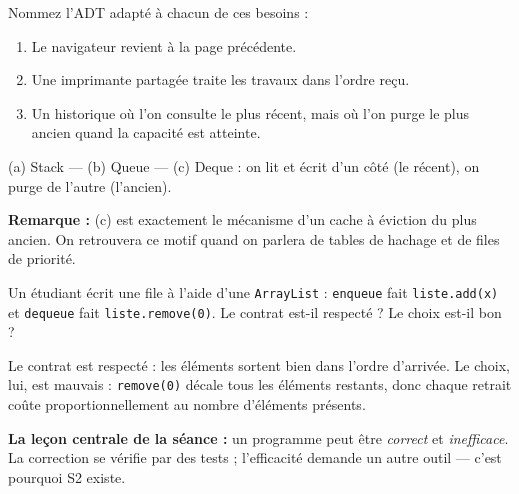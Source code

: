 \documentclass[11pt,a4paper]{article}
\theoremstyle{definition}
\theoremstyle{remark}
\begin{document}
\begin{appliboxQ}
Nommez l'ADT adapté à chacun de ces besoins :
\begin{enumerate}[nosep,label=(\alph*)]
    \item Le navigateur revient à la page précédente.
    \item Une imprimante partagée traite les travaux dans l'ordre reçu.
    \item Un historique où l'on consulte le plus récent, mais où l'on purge
          le plus ancien quand la capacité est atteinte.
\end{enumerate}
\end{appliboxQ}

\begin{appliboxR}[Réponse]
(a) Stack --- (b) Queue --- (c) Deque : on lit et écrit d'un côté (le
récent), on purge de l'autre (l'ancien).

\textbf{Remarque :} (c) est exactement le mécanisme d'un cache à éviction du
plus ancien. On retrouvera ce motif quand on parlera de tables de hachage et
de files de priorité.
\end{appliboxR}

\begin{appliboxQ}
Un étudiant écrit une file à l'aide d'une \texttt{ArrayList} :
\texttt{enqueue} fait \texttt{liste.add(x)} et \texttt{dequeue} fait
\texttt{liste.remove(0)}. Le contrat est-il respecté ? Le choix est-il bon ?
\end{appliboxQ}

\begin{appliboxR}[Réponse]
Le contrat est respecté : les éléments sortent bien dans l'ordre d'arrivée.
Le choix, lui, est mauvais : \texttt{remove(0)} décale tous les éléments
restants, donc chaque retrait coûte proportionnellement au nombre d'éléments
présents.

\textbf{La leçon centrale de la séance :} un programme peut être
\emph{correct} et \emph{inefficace}. La correction se vérifie par des tests ;
l'efficacité demande un autre outil --- c'est pourquoi S2 existe.
\end{appliboxR}
\end{document}
